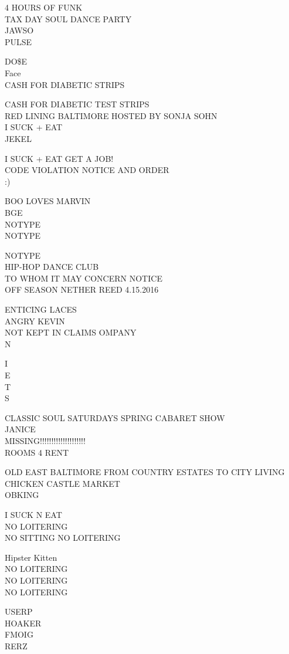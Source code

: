 \documentclass[10pt,letterpaper]{article}
\begin{document}
4 HOURS OF FUNK\\
TAX DAY SOUL DANCE PARTY\\
JAWSO\\
PULSE

DO\$E\\
Face\\
CASH FOR DIABETIC STRIPS

CASH FOR DIABETIC TEST STRIPS\\
RED LINING BALTIMORE HOSTED BY SONJA SOHN\\
I SUCK + EAT\\
JEKEL

I SUCK + EAT GET A JOB!\\
CODE VIOLATION NOTICE AND ORDER\\
:)

BOO LOVES MARVIN\\
BGE\\
NOTYPE\\
NOTYPE

NOTYPE\\
HIP{-}HOP DANCE CLUB\\
TO WHOM IT MAY CONCERN NOTICE\\
OFF SEASON NETHER REED 4.15.2016

ENTICING LACES\\
ANGRY KEVIN\\
NOT KEPT IN CLAIMS OMPANY\\
N

I\\
E\\
T\\
S

CLASSIC SOUL SATURDAYS SPRING CABARET SHOW\\
JANICE\\
MISSING!!!!!!!!!!!!!!!!!!!!\\
ROOMS 4 RENT

OLD EAST BALTIMORE FROM COUNTRY ESTATES TO CITY LIVING\\
CHICKEN CASTLE MARKET\\
OBKING

I SUCK N EAT\\
NO LOITERING\\
NO SITTING NO LOITERING

Hipster Kitten\\
NO LOITERING\\
NO LOITERING\\
NO LOITERING

USERP\\
HOAKER\\
FMOIG\\
RERZ
\end{document}
